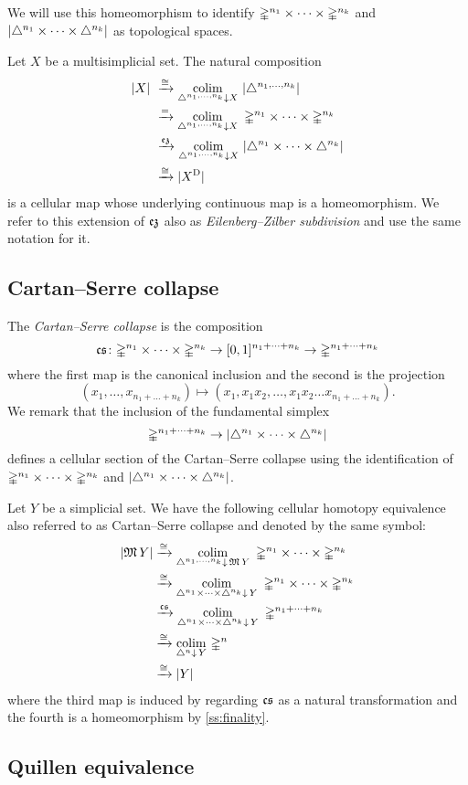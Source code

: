 We will use this homeomorphism to identify $\mathbb{\Delta}^{n_1} \times \dots \times \mathbb{\Delta}^{n_k}$ and $\lvert\triangle^{n_1} \times \dots \times \triangle^{n_k}\rvert$ as topological spaces.

Let $X$ be a multisimplicial set.
The natural composition
\begin{align*}
	\bars{X} \ &\xra{\cong}
	\colim_{\simplex^{n_1, \dots, n_k} \downarrow X} \ \bars{\simplex^{n_1, \dots, n_k}} \\ &\xra{=}
	\colim_{\simplex^{n_1, \dots, n_k} \downarrow X} \ \gsimplex^{n_1} \times \dots \times \gsimplex^{n_k} \\ &\xra{\ez}
	\colim_{\simplex^{n_1, \dots, n_k} \downarrow X} \ \bars{\simplex^{n_1} \times \dots \times \simplex^{n_k}} \\ &\xra{\cong}
	\bars{X^{\diag}}
\end{align*}
is a cellular map whose underlying continuous map is a homeomorphism.
We refer to this extension of $\operatorname{\mathfrak{ez}}$ also as \textit{Eilenberg--Zilber subdivision} and use the same notation for it.

\subsection{Cartan--Serre collapse} \label{ss:cartan-serre map}

The \textit{Cartan--Serre collapse} is the composition
\[
\operatorname{\mathfrak{cs}} \colon
\mathbb{\Delta}^{n_1} \times \dots \times \mathbb{\Delta}^{n_k} \to
[0,1]^{n_1 + \dots + n_k} \to
\mathbb{\Delta}^{n_1 + \dots + n_k}
\]
where the first map is the canonical inclusion and the second is the projection
\[
(x_1, \dots, x_{n_1 + \dots + n_k}) \mapsto (x_1, x_1x_2, \dots, x_1x_2 \dots x_{n_1 + \dots + n_k}).
\]
We remark that the inclusion of the fundamental simplex
\[
\mathbb{\Delta}^{n_1 + \dots + n_k} \to \lvert\triangle^{n_1} \times \dots \times \triangle^{n_k}\rvert
\]
defines a cellular section of the Cartan--Serre collapse using the identification of $\mathbb{\Delta}^{n_1} \times \dots \times \mathbb{\Delta}^{n_k}$ and $\lvert\triangle^{n_1} \times \dots \times \triangle^{n_k}\rvert$.

Let $Y$ be a simplicial set.
We have the following cellular homotopy equivalence also referred to as Cartan--Serre collapse and denoted by the same symbol:
\[
\begin{split}
\lvert\operatorname{\mathfrak{M}} Y\rvert & \xrightarrow{\cong}
\operatorname*{colim}_{\triangle^{n_1, \dots, n_k} \downarrow \, \operatorname{\mathfrak{M}} Y} \
\mathbb{\Delta}^{n_1} \times \cdots \times \mathbb{\Delta}^{n_k} \\ & \xrightarrow{\cong}
\operatorname*{colim}_{\triangle^{n_1} \times \dots \times \triangle^{n_k} \downarrow \, Y} \
\mathbb{\Delta}^{n_1} \times \cdots \times \mathbb{\Delta}^{n_k} \\ & \xrightarrow{\operatorname{\mathfrak{cs}}}
\operatorname*{colim}_{\triangle^{n_1} \times \dots \times \triangle^{n_k} \downarrow \, Y} \
\mathbb{\Delta}^{n_1 + \dots + n_k} \\ & \xrightarrow{\cong}
\operatorname*{colim}_{\triangle^{n} \downarrow \, Y} \,
\mathbb{\Delta}^{n} \\ & \xrightarrow{\cong}
\lvert Y\rvert
\end{split}
\]
where the third map is induced by regarding $\operatorname{\mathfrak{cs}}$ as a natural transformation and the fourth is a homeomorphism by \cref{ss:finality}.

\subsection{Quillen equivalence}

